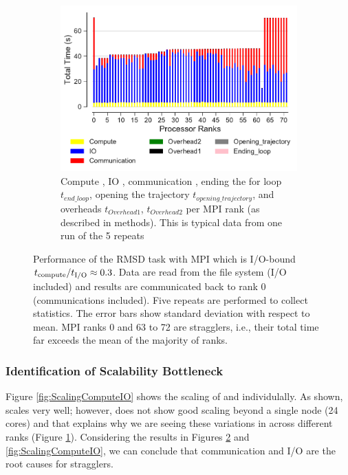 \begin{figure}
\begin{subfigure} {.8\textwidth}
  \includegraphics[width=\linewidth]{figures/main-RMSD-BarPlot-rank-comparison_72_4.pdf}
  \caption{Compute \tcomp, IO \tIO, communication \tcomm, ending the for loop $t_{end\_loop}$,
  opening the trajectory $t_{opening\_trajectory}$, and overheads $t_{Overhead1}$,  $t_{Overhead2}$ per MPI rank (as described in methods).
  This is typical data from one run of the 5 repeats}
  \label{fig:MPIranks}
\end{subfigure}
%
\caption{Performance of the RMSD task with MPI which is I/O-bound ${t}_{\text{compute}}/{t}_{\text{I/O}} \approx 0.3$.
Data are read from the file system (I/O included) and results are communicated back to
rank 0 (communications included). Five repeats are performed to collect statistics. The error bars show
standard deviation with respect to mean. MPI ranks 0 and 63 to 72 are stragglers, i.e., their total time 
far exceeds the mean of the majority of ranks.}
  
\label{fig:MPIwithIO}
\end{figure} 

\subsubsection*{Identification of Scalability Bottleneck}

Figure \ref{fig:ScalingComputeIO} shows the scaling of \tcomp and \tIO individulally. 
As shown, \tcomp scales very well; however, \tIO does not show good scaling beyond a single node (24 cores) and that explains why we are seeing these variations in \tIO across different ranks (Figure \ref{fig:MPIranks}). 
Considering the results in Figures \ref{fig:MPIwithIO} and \ref{fig:ScalingComputeIO}, we can conclude that communication and I/O are the root causes for stragglers. 

